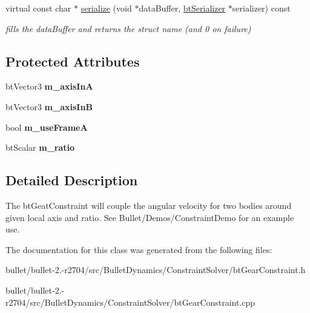 \begin{DoxyCompactItemize}
\item 
\hypertarget{classbt_gear_constraint_a223dc7a58e6d97f6b9cd5bd73b1dd440}{virtual const char $\ast$ \hyperlink{classbt_gear_constraint_a223dc7a58e6d97f6b9cd5bd73b1dd440}{serialize} (void $\ast$data\+Buffer, \hyperlink{classbt_serializer}{bt\+Serializer} $\ast$serializer) const }\label{classbt_gear_constraint_a223dc7a58e6d97f6b9cd5bd73b1dd440}

\begin{DoxyCompactList}\small\item\em fills the data\+Buffer and returns the struct name (and 0 on failure) \end{DoxyCompactList}\end{DoxyCompactItemize}
\subsection*{Protected Attributes}
\begin{DoxyCompactItemize}
\item 
\hypertarget{classbt_gear_constraint_acff9277f36d0e72e88d47f608adfa2d7}{bt\+Vector3 {\bfseries m\+\_\+axis\+In\+A}}\label{classbt_gear_constraint_acff9277f36d0e72e88d47f608adfa2d7}

\item 
\hypertarget{classbt_gear_constraint_a64c06b83340574c1fcc3be1a09ce3de1}{bt\+Vector3 {\bfseries m\+\_\+axis\+In\+B}}\label{classbt_gear_constraint_a64c06b83340574c1fcc3be1a09ce3de1}

\item 
\hypertarget{classbt_gear_constraint_a1c3cf937feefba932336972a5a62dbc6}{bool {\bfseries m\+\_\+use\+Frame\+A}}\label{classbt_gear_constraint_a1c3cf937feefba932336972a5a62dbc6}

\item 
\hypertarget{classbt_gear_constraint_a4fd812c772ec474962d6e7534b807613}{bt\+Scalar {\bfseries m\+\_\+ratio}}\label{classbt_gear_constraint_a4fd812c772ec474962d6e7534b807613}

\end{DoxyCompactItemize}


\subsection{Detailed Description}
The bt\+Geat\+Constraint will couple the angular velocity for two bodies around given local axis and ratio. See Bullet/\+Demos/\+Constraint\+Demo for an example use. 

The documentation for this class was generated from the following files\+:\begin{DoxyCompactItemize}
\item 
bullet/bullet-\/2.-\/r2704/src/\+Bullet\+Dynamics/\+Constraint\+Solver/bt\+Gear\+Constraint.\+h\item 
bullet/bullet-\/2.-\/r2704/src/\+Bullet\+Dynamics/\+Constraint\+Solver/bt\+Gear\+Constraint.\+cpp\end{DoxyCompactItemize}

